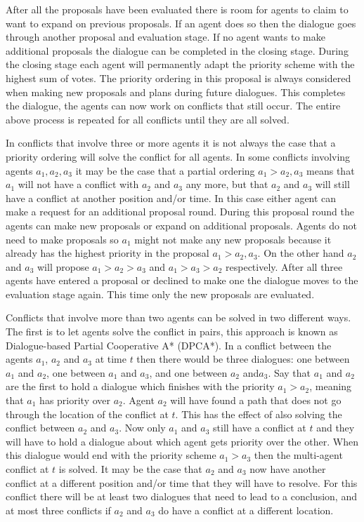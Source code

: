 After all the proposals have been evaluated there is room for agents to claim
to want to expand on previous proposals. If an agent does so then the dialogue
goes through another proposal and evaluation stage. If no agent wants to make
additional proposals the dialogue can be completed in the closing stage. During
the closing stage each agent will permanently adapt the priority scheme with
the highest sum of votes. The priority ordering in this proposal is always
considered when making new proposals and plans during future dialogues. This
completes the dialogue, the agents can now work on conflicts that still occur.
The entire above process is repeated for all conflicts until they are all
solved.

In conflicts that involve three or more agents it is not always the case that a
priority ordering will solve the conflict for all agents. In some conflicts
involving agents $a_1, a_2, a_3$ it may be the case that a partial ordering
$a_1 > a_2, a_3$ means that $a_1$ will not have a conflict with $a_2$ and $a_3$
any more, but that $a_2$ and $a_3$ will still have a conflict at another
position and/or time. In this case either agent can make a request for an
additional proposal round. During this proposal round the agents can make new
proposals or expand on additional proposals. Agents do not need to make
proposals so $a_1$ might not make any new proposals because it already has the
highest priority in the proposal $a_1 > a_2, a_3$. On the other hand $a_2$ and
$a_3$ will propose $a_1 > a_2 > a_3$ and $a_1 > a_3 > a_2$ respectively. After 
all three agents have entered a
proposal or declined to make one the dialogue moves to the evaluation stage
again. This time only the new proposals are evaluated.

Conflicts that involve more than two agents can be solved in two different
ways. The first is to let agents solve the conflict in pairs, this approach is
known as Dialogue-based Partial Cooperative A* (DPCA*). In a conflict between
the agents $a_1$, $a_2$ and $a_3$ at time $t$ then there would be three
dialogues: one between $a_1$ and $a_2$, one between $a_1$ and $a_3$, and one
between $a_2$ and$a_3$. Say that $a_1$ and $a_2$ are the first to hold a
dialogue which finishes with the priority $a_1 > a_2$, meaning that $a_1$ has
priority over $a_2$. Agent $a_2$ will have found a path that does not go
through the location of the conflict at $t$. This has the effect of also
solving the conflict between $a_2$ and $a_3$. Now only $a_1$ and $a_3$ still
have a conflict at $t$ and they will have to hold a dialogue about which agent
gets priority over the other. When this dialogue would end with the priority
scheme $a_1 > a_3$ then the multi-agent conflict at $t$ is solved. It may be
the case that $a_2$ and $a_3$ now have another conflict at a different position
and/or time that they will have to resolve. For this conflict there will be at
least two dialogues that need to lead to a conclusion, and at most three
conflicts if $a_2$ and $a_3$ do have a conflict at a different location.

